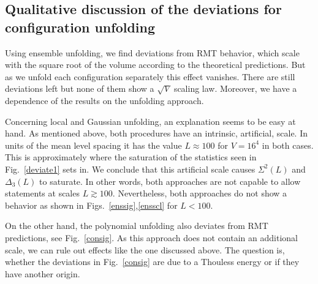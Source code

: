 \subsection{Qualitative discussion of the deviations for
  configuration unfolding}
\label{sec35}

Using ensemble unfolding, we find deviations from RMT behavior, which
scale with the square root of the volume according to the theoretical
predictions. But as we unfold each configuration separately this
effect vanishes. There are still deviations left but none of them show
a $\sqrt{V}$ scaling law.  Moreover, we have a dependence of the
results on the unfolding approach.

Concerning local and Gaussian unfolding, an explanation seems to be
easy at hand. As mentioned above, both procedures have an intrinsic,
artificial, scale. In units of the mean level spacing it has the value
$L\approx100$ for $V=16^4$ in both cases. This is approximately where
the saturation of the statistics seen in Fig.~\ref{deviate1} sets in.
We conclude that this artificial scale causes $\Sigma^2(L)$ and
$\Delta_3(L)$ to saturate. In other words, both approaches are not
capable to allow statements at scales $L\gtrsim100$.  Nevertheless,
both approaches do not show a behavior as shown in
Figs.~\ref{enssig},\ref{ensscl} for $L<100$.

On the other hand, the polynomial unfolding also deviates from RMT
predictions, see Fig.~\ref{consig}. As this approach does not contain
an additional scale, we can rule out effects like the one discussed
above. The question is, whether the deviations in Fig.~\ref{consig} are
due to a Thouless energy or if they have another origin.

